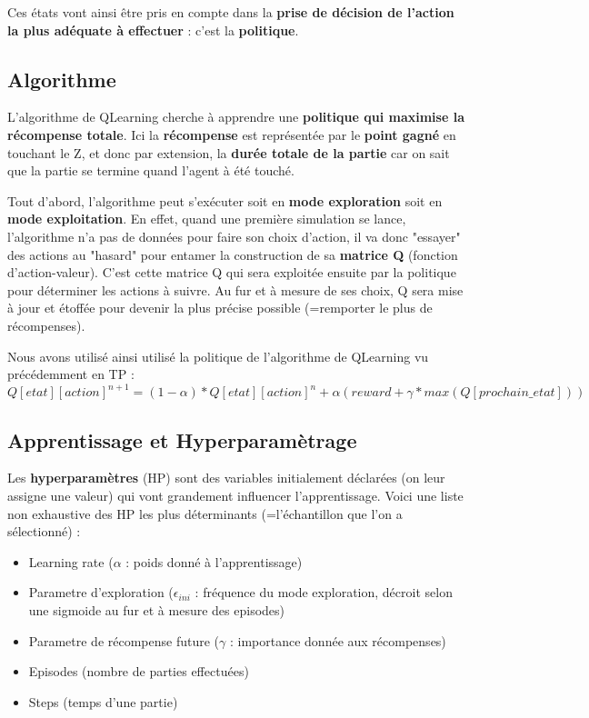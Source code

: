 \documentclass[12pt]{article}
\begin{document}
\begin{page}
Ces états vont ainsi être pris en compte dans la \textbf{prise de décision de l'action la plus adéquate à effectuer} : c'est la \textbf{politique}.
\subsection{Algorithme}
L'algorithme de QLearning cherche à apprendre une \textbf{politique qui maximise la récompense totale}. Ici la \textbf{récompense} est représentée par le \textbf{point gagné} en touchant le Z, et donc par extension, la \textbf{durée totale de la partie} car on sait que la partie se termine quand l'agent à été touché.

Tout d'abord, l'algorithme peut s’exécuter soit en \textbf{mode exploration} soit en \textbf{mode exploitation}. En effet, quand une première simulation se lance, l'algorithme n'a pas de données pour faire son choix d'action, il va donc "essayer" des actions au "hasard" pour entamer la construction de sa \textbf{matrice Q} (fonction d'action-valeur). C'est cette matrice Q qui sera exploitée ensuite par la politique pour déterminer les actions à suivre. Au fur et à mesure de ses choix, Q sera mise à jour et étoffée pour devenir la plus précise possible (=remporter le plus de récompenses).

Nous avons utilisé ainsi utilisé la politique de l'algorithme de QLearning vu précédemment en TP :
\begin{equation}
	Q[etat][action]^{n+1}=(1-\alpha)*Q[etat][action]^{n}+\alpha(reward+\gamma*max(Q[prochain\_etat]))
\end{equation}

\subsection{Apprentissage et Hyperparamètrage}
Les \textbf{hyperparamètres} (HP) sont des variables initialement déclarées (on leur assigne une valeur) qui vont grandement influencer l'apprentissage. Voici une liste non exhaustive des HP les plus déterminants (=l'échantillon que l'on a sélectionné) :
\begin{itemize}
\item Learning rate ($\alpha$ : poids donné à l'apprentissage)
\item Parametre d'exploration ($\epsilon_{ini}$ : fréquence du mode exploration, décroit selon une sigmoide au fur et à mesure des episodes)
\item Parametre de récompense future ($\gamma$ : importance donnée aux récompenses)
\item Episodes (nombre de parties effectuées)
\item Steps (temps d’une partie)
\end{itemize}


\end{page}
\end{document}
